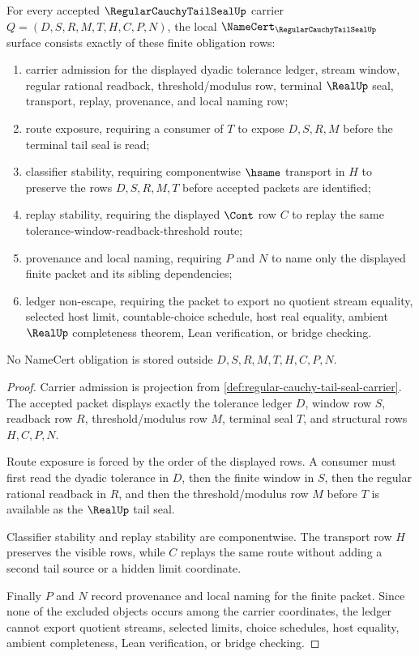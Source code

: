 \begin{theorem}
\label{thm:regular-cauchy-tail-seal-namecert-obligations}
For every accepted $\RegularCauchyTailSealUp$ carrier $Q=(D,S,R,M,T,H,C,P,N)$, the local $\NameCert_{\RegularCauchyTailSealUp}$ surface consists exactly of these finite obligation rows:
\begin{enumerate}
\item carrier admission for the displayed dyadic tolerance ledger, stream window, regular rational readback, threshold/modulus row, terminal $\RealUp$ seal, transport, replay, provenance, and local naming row;
\item route exposure, requiring a consumer of $T$ to expose $D,S,R,M$ before the terminal tail seal is read;
\item classifier stability, requiring componentwise $\hsame$ transport in $H$ to preserve the rows $D,S,R,M,T$ before accepted packets are identified;
\item replay stability, requiring the displayed $\Cont$ row $C$ to replay the same tolerance-window-readback-threshold route;
\item provenance and local naming, requiring $P$ and $N$ to name only the displayed finite packet and its sibling dependencies;
\item ledger non-escape, requiring the packet to export no quotient stream equality, selected host limit, countable-choice schedule, host real equality, ambient $\RealUp$ completeness theorem, Lean verification, or bridge checking.
\end{enumerate}
No NameCert obligation is stored outside $D,S,R,M,T,H,C,P,N$.
\end{theorem}
\begin{proof}
Carrier admission is projection from \autoref{def:regular-cauchy-tail-seal-carrier}. The accepted packet displays exactly the tolerance ledger $D$, window row $S$, readback row $R$, threshold/modulus row $M$, terminal seal $T$, and structural rows $H,C,P,N$.

Route exposure is forced by the order of the displayed rows. A consumer must first read the dyadic tolerance in $D$, then the finite window in $S$, then the regular rational readback in $R$, and then the threshold/modulus row $M$ before $T$ is available as the $\RealUp$ tail seal.

Classifier stability and replay stability are componentwise. The transport row $H$ preserves the visible rows, while $C$ replays the same route without adding a second tail source or a hidden limit coordinate.

Finally $P$ and $N$ record provenance and local naming for the finite packet. Since none of the excluded objects occurs among the carrier coordinates, the ledger cannot export quotient streams, selected limits, choice schedules, host equality, ambient completeness, Lean verification, or bridge checking.
\end{proof}


